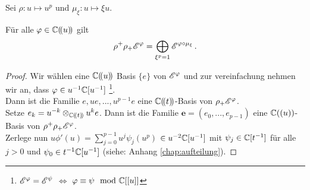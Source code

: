 
\begin{comment}
  sabbah\_Fourier-local.pdf lemma 2.4
\end{comment}

Sei $\rho:u\mapsto u^p$ und $\mu_\xi:u\mapsto\xi u$.
\begin{lem}
  \cite[Lem 2.4]{sabbah_Fourier-local}
  Für alle $\varphi \in \mathbb{C}(\!(u)\!)$ gilt
  \[ \rho^+\rho_+\mathscr{E}^\varphi=\bigoplus_{\xi^p=1}\mathscr{E}^{\varphi\circ\mu_\xi} \,. \]
\end{lem}

\begin{proof}

Wir wählen eine $\mathbb{C}(\!(u)\!)$ Basis $\{e\}$ von $\mathscr{E}^\varphi$ und zur
vereinfachung nehmen wir an, dass $\varphi\in u^{-1}\mathbb{C}[u^{-1}]$
\footnote{$\mathscr{E}^\varphi=\mathscr{E}^\psi$ $\Leftrightarrow$ $\varphi\equiv\psi\mod{\mathbb{C}}[[u]]$}.\\
Dann ist die Familie $e,ue,...,u^{p-1}e$ eine $\mathbb{C}(\!(t)\!)$-Basis von
$\rho_+\mathscr{E}^\varphi$.\\
Setze $e_k=u^{-k}\otimes_{\mathbb{C}(\!(t)\!)}u^ke$.
Dann ist die Familie $\mathbf{e}=(e_0,...,e_{p-1})$ eine $\mathbb{C}((u))$-Basis von
$\rho^+\rho_+\mathscr{E}^\varphi$.\\
Zerlege nun $u\phi'(u)=\sum_{j=0}^{p-1}u^j\psi_j(u^p)$ $\in u^{-2}\mathbb{C}[u^{-1}]$
mit $\psi_j\in\mathbb{C}[t^{-1}]$ für alle $j>0$ und $\psi_0\in t^{-1}\mathbb{C}[u^{-1}]$
(siehe: Anhang \ref{chap:aufteilung}).


\end{proof}
